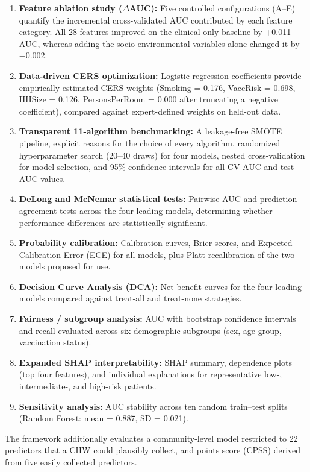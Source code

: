 \documentclass[a4paper,fleqn]{cas-dc}
\begin{document}
\begin{enumerate}[leftmargin=1.6em,itemsep=2pt,topsep=3pt]
\item \textbf{Feature ablation study ($\Delta$AUC):} Five controlled configurations (A--E) quantify the incremental cross-validated AUC contributed by each feature category. All 28 features improved on the clinical-only baseline by +0.011 AUC, whereas adding the socio-environmental variables alone changed it by $-$0.002.
\item \textbf{Data-driven CERS optimization:} Logistic regression coefficients provide empirically estimated CERS weights (Smoking = 0.176, VaccRisk = 0.698, HHSize = 0.126, PersonsPerRoom = 0.000 after truncating a negative coefficient), compared against expert-defined weights on held-out data.
\item \textbf{Transparent 11-algorithm benchmarking:} A leakage-free SMOTE pipeline, explicit reasons for the choice of every algorithm, randomized hyperparameter search (20--40 draws) for four models, nested cross-validation for model selection, and 95\% confidence intervals for all CV-AUC and test-AUC values.
\item \textbf{DeLong and McNemar statistical tests:} Pairwise AUC and prediction-agreement tests across the four leading models, determining whether performance differences are statistically significant.
\item \textbf{Probability calibration:} Calibration curves, Brier scores, and Expected Calibration Error (ECE) for all models, plus Platt recalibration of the two models proposed for use.
\item \textbf{Decision Curve Analysis (DCA):} Net benefit curves for the four leading models compared against treat-all and treat-none strategies.
\item \textbf{Fairness / subgroup analysis:} AUC with bootstrap confidence intervals and recall evaluated across six demographic subgroups (sex, age group, vaccination status).
\item \textbf{Expanded SHAP interpretability:} SHAP summary, dependence plots (top four features), and individual explanations for representative low-, intermediate-, and high-risk patients.
\item \textbf{Sensitivity analysis:} AUC stability across ten random train--test splits (Random Forest: mean = 0.887, SD = 0.021).
\end{enumerate}

The framework additionally evaluates a community-level model restricted to 22 predictors that a CHW could plausibly collect, and points score (CPSS) derived from five easily collected predictors.
\end{document}
